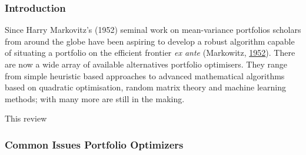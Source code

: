 \documentclass[11pt,preprint, authoryear]{elsarticle}
\numberwithin{equation}{section}
\numberwithin{figure}{section}
\numberwithin{table}{section}
\begin{document}
\hypertarget{introduction-1}{%
\subsubsection{Introduction}\label{introduction-1}}

Since Harry Markovitz's (1952) seminal work on mean-variance portfolios
scholars from around the globe have been aspiring to develop a robust
algorithm capable of situating a portfolio on the efficient frontier
\emph{ex ante} (Markowitz, \protect\hyperlink{ref-markowitz}{1952}).
There are now a wide array of available alternatives portfolio
optimisers. They range from simple heuristic based approaches to
advanced mathematical algorithms based on quadratic optimisation, random
matrix theory and machine learning methods; with many more are still in
the making.

This review

\hypertarget{common-issues-portfolio-optimizers}{%
\subsubsection{Common Issues Portfolio
Optimizers}\label{common-issues-portfolio-optimizers}}
\end{document}
